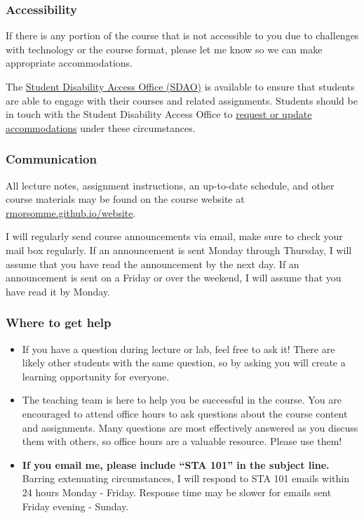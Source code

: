 \documentclass[
  letterpaper,
  DIV=11,
  numbers=noendperiod]{scrartcl}
\providecommand{\tightlist}{%
  \setlength{\itemsep}{0pt}\setlength{\parskip}{0pt}}
\begin{document}
\hypertarget{accessibility}{%
\subsubsection{Accessibility}\label{accessibility}}

If there is any portion of the course that is not accessible to you due
to challenges with technology or the course format, please let me know
so we can make appropriate accommodations.

The \href{https://access.duke.edu/students}{Student Disability Access
Office (SDAO)} is available to ensure that students are able to engage
with their courses and related assignments. Students should be in touch
with the Student Disability Access Office to
\href{https://access.duke.edu/requests}{request or update
accommodations} under these circumstances.

\hypertarget{communication}{%
\subsubsection{Communication}\label{communication}}

All lecture notes, assignment instructions, an up-to-date schedule, and
other course materials may be found on the course website at
\href{https://rmorsomme.github.io/website}{rmorsomme.github.io/website}.

I will regularly send course announcements via email, make sure to check
your mail box regularly. If an announcement is sent Monday through
Thursday, I will assume that you have read the announcement by the next
day. If an announcement is sent on a Friday or over the weekend, I will
assume that you have read it by Monday.

\hypertarget{where-to-get-help}{%
\subsubsection{Where to get help}\label{where-to-get-help}}

\begin{itemize}
\tightlist
\item
  If you have a question during lecture or lab, feel free to ask it!
  There are likely other students with the same question, so by asking
  you will create a learning opportunity for everyone.
\item
  The teaching team is here to help you be successful in the course. You
  are encouraged to attend office hours to ask questions about the
  course content and assignments. Many questions are most effectively
  answered as you discuss them with others, so office hours are a
  valuable resource. Please use them!
\item
  \textbf{If you email me, please include ``STA 101'' in the subject
  line.} Barring extenuating circumstances, I will respond to STA 101
  emails within 24 hours Monday - Friday. Response time may be slower
  for emails sent Friday evening - Sunday.
\end{itemize}
\end{document}
